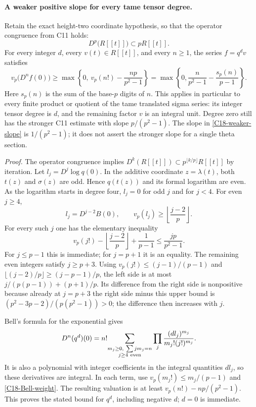 \documentclass[11pt]{article}
\theoremstyle{definition}\newtheorem{definition}[theorem]{Definition}\newtheorem{remark}[theorem]{Remark}
\begin{document}
\paragraph{A weaker positive slope for every tame tensor degree.}
Retain the exact height-two coordinate hypothesis, so that the
operator congruence from C11 holds:
\[
 D^p\bigl(R[[t]]\bigr)\subset pR[[t]].
\]
For every integer $d$, every $v(t)\in R[[t]]$, and every $n\geq1$,
the series $f=q^dv$ satisfies
\begin{equation}\label{C18-weaker-slope}
 v_p\bigl(D^nf(0)\bigr)
 \geq\max\left\{0,\ v_p(n!)-\frac{np}{p^2-1}\right\}
 =\max\left\{0,\frac{n}{p^2-1}
                         -\frac{s_p(n)}{p-1}\right\}.
\end{equation}
Here $s_p(n)$ is the sum of the base-$p$ digits of $n$.
This applies in particular to every finite product or quotient of the
tame translated sigma series: its integer tensor degree is $d$, and
the remaining factor $v$ is an integral unit.  Degree zero still has
the stronger C11 estimate with slope $p/(p^2-1)$.
The slope in \eqref{C18-weaker-slope} is $1/(p^2-1)$; it does not assert
the stronger slope for a single theta section.

\emph{Proof.}
The operator congruence implies
$D^k(R[[t]])\subset p^{\lfloor k/p\rfloor}R[[t]]$ by iteration.
Let $l_j=D^j\log q(0)$.  In the additive coordinate $z=\lambda(t)$,
both $t(z)$ and $\sigma(z)$ are odd.  Hence $q(t(z))$ and its formal
logarithm are even.  As the logarithm starts in degree four,
$l_j=0$ for odd $j$ and for $j<4$.  For even $j\geq4$,
\[
 l_j=D^{j-2}B(0),\qquad
 v_p(l_j)\geq\left\lfloor\frac{j-2}{p}\right\rfloor.
\]
For every such $j$ one has the elementary inequality
\begin{equation}\label{C18-Bell-weight}
 v_p(j!)-\left\lfloor\frac{j-2}{p}\right\rfloor
          +\frac1{p-1}\leq\frac{jp}{p^2-1}.
\end{equation}
For $j\leq p-1$ this is immediate; for $j=p+1$ it is an equality.
The remaining even integers satisfy $j\geq p+3$.  Using
$v_p(j!)\leq(j-1)/(p-1)$ and
$\lfloor(j-2)/p\rfloor\geq(j-p-1)/p$, the left side is at most
$j/(p(p-1))+(p+1)/p$.  Its difference from the right side is
nonpositive because already at $j=p+3$ the right side minus this
upper bound is
$(p^2-3p-2)/(p(p^2-1))>0$; the difference then increases with $j$.

Bell's formula for the exponential gives
\[
 D^n(q^d)(0)=
 n!\!\sum_{\substack{m_j\geq0,\ \sum jm_j=n\\j\geq4\ {\rm even}}}
       \prod_j\frac{(d l_j)^{m_j}}{m_j!(j!)^{m_j}}.
\]
It is also a polynomial with integer coefficients in the integral
quantities $d l_j$, so these derivatives are integral.  In each term,
use $v_p(m_j!)\leq m_j/(p-1)$ and
\eqref{C18-Bell-weight}.  The resulting valuation is at least
$v_p(n!)-np/(p^2-1)$.  This proves the stated bound for $q^d$,
including negative $d$; $d=0$ is immediate.
\end{document}
